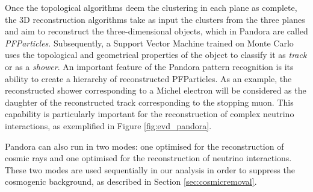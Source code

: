 Once the topological algorithms deem the clustering in each plane as complete, the 3D reconstruction algorithms take as input the clusters from the three planes and aim to reconstruct the three-dimensional objects, which in Pandora are called \emph{PFParticles}.
Subsequently, a Support Vector Machine trained on Monte Carlo uses the topological and geometrical properties of the object to classify it as \emph{track} or as a \emph{shower}. 
An important feature of the Pandora pattern recognition is its ability to create a hierarchy of reconstructed PFParticles. As an example, the reconstructed shower corresponding to a Michel electron will be considered as the daughter of the reconstructed track corresponding to the stopping muon. This capability is particularly important for the reconstruction of complex neutrino interactions, as exemplified in Figure \ref{fig:evd_pandora}.

Pandora can also run in two modes: one optimised for the reconstruction of cosmic rays and one optimised for the reconstruction of neutrino interactions. These two modes are used sequentially in our analysis in order to suppress the cosmogenic background, as described in Section \ref{sec:cosmicremoval}.